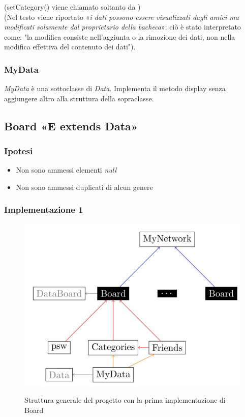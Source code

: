 \documentclass[10pt, a4paper]{article}
\begin{document}
\begin{footnotesize}
(setCategory() viene chiamato soltanto da )\\
(Nel testo viene riportato «\textit{i dati possono essere
visualizzati dagli amici ma modificati solamente dal proprietario della bacheca}»: ciò è stato interpretato come: "la modifica consiste nell'aggiunta o la rimozione dei dati, non nella  modifica effettiva del contenuto dei dati").
\end{footnotesize}
\subsubsection{MyData}
\textit{MyData} è una sottoclasse di \textit{Data}. Implementa il metodo display{} senza aggiungere altro alla struttura della sopraclasse.
\clearpage
\subsection{Board «E extends Data» }
\subsubsection{Ipotesi}
\begin{itemize}
\item Non sono ammessi elementi \textit{null}
\item Non sono ammessi duplicati di alcun genere
\end{itemize}

\subsubsection{Implementazione 1}
\begin{figure}[h!]
	\centering
	\includegraphics[scale=0.4]{diag1}
	\label{fig:diag1}
	\caption{Struttura generale del progetto con la prima implementazione di Board}
\end{figure}
\end{document}
